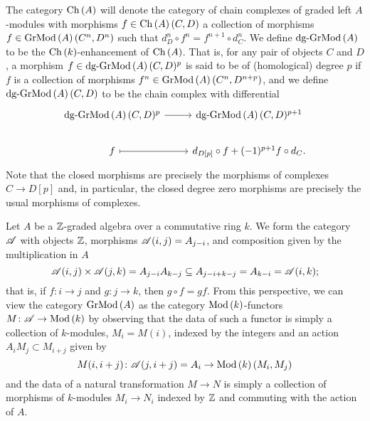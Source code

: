 \documentclass[dissertation.tex]{subfiles}
\begin{document}
The category $\operatorname{Ch}\left(A\right)$ will denote the category of chain complexes of graded left $A$-modules with morphisms $f \in \operatorname{Ch}\left(A\right)(C,D)$ a collection of morphisms $f \in \operatorname{GrMod}\left(A\right)(C^n,D^n)$ such that $d^n_D \circ f^n = f^{n+1} \circ d^n_C$.
We define $\operatorname{dg-GrMod}\left(A\right)$ to be the $\operatorname{Ch}\left(k\right)$-enhancement of $\operatorname{Ch}\left(A\right)$.
That is, for any pair of objects $C$ and $D$, a morphism $f \in \operatorname{dg-GrMod}\left(A\right)(C,D)^p$ is said to be of (homological) degree $p$ if $f$ is a collection of morphisms
$f^{n} \in \operatorname{GrMod}\left(A\right)(C^n,D^{n + p})$, and we define $\operatorname{dg-GrMod}\left(A\right)(C,D)$ to be the chain complex with differential
$$\begin{tikzcd}
  \dgr{A}(C,D)^p \arrow{r} &\dgr{A}(C,D)^{p+1}\\
  f \arrow[mapsto]{r} & d_{D[p]} \circ f + (-1)^{p+1} f \circ d_C.
\end{tikzcd}$$
Note that the closed morphisms are precisely the morphisms of complexes $C \to D[p]$ and, in particular, the closed degree zero morphisms are precisely the usual morphisms of complexes.

Let $A$ be a $\mathbb{Z}$-graded algebra over a commutative ring $k$.
We form the category $\mathscr{A}$ with objects $\mathbb{Z}$, morphisms $\mathscr{A}(i,j) = A_{j-i}$, and composition given by the multiplication in $A$
$$\mathscr{A}(i,j) \times \mathscr{A}(j,k) = A_{j - i}A_{k - j} \subseteq A_{j - i + k - j} = A_{k - i} = \mathscr{A}(i,k);$$
that is, if $f \colon i \to j$ and $g \colon j \to k$, then $g \circ f = g f$.
From this perspective, we can view the category $\operatorname{GrMod}\left(A\right)$ as the category $\operatorname{Mod}\left(k\right)$-functors $M \colon \mathscr{A} \to \operatorname{Mod}\left(k\right)$ by observing that the data of such a functor is simply a collection of $k$-modules, $M_i = M(i)$, indexed by the integers and an action $A_i M_j \subset M_{i+j}$ given by
$$M(i, i+j) \colon \mathscr{A}(j,i+j) = A_{i} \to \operatorname{Mod}\left(k\right)(M_i, M_j)$$
and the data of a natural transformation $M \to N$ is simply a collection of morphisms of $k$-modules $M_i \to N_i$ indexed by $\mathbb{Z}$ and commuting with the action of $A$.
\end{document}
